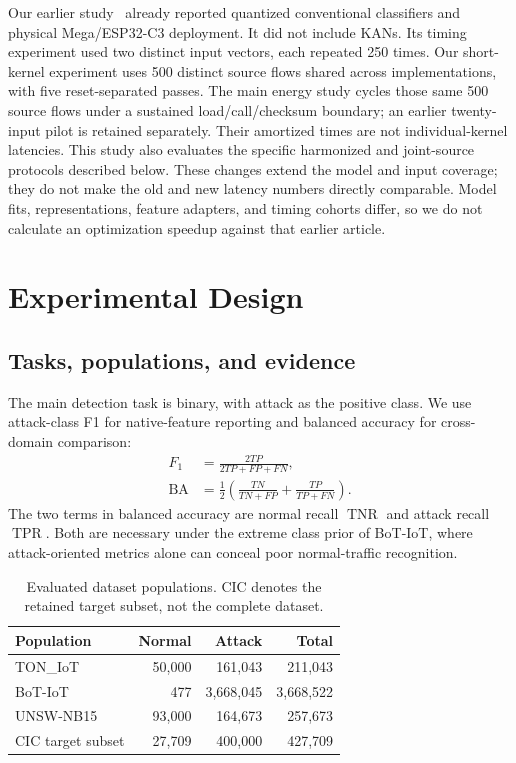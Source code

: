 \documentclass{ieeeaccess}
\newcommand{\BA}{\operatorname{BA}}
\newcommand{\TNR}{\operatorname{TNR}}
\newcommand{\TPR}{\operatorname{TPR}}
\begin{document}
Our earlier study~\cite{debernardis2026lightweight} already reported quantized conventional classifiers and physical Mega/ESP32-C3 deployment. It did not include KANs. Its timing experiment used two distinct input vectors, each repeated 250 times. Our short-kernel experiment uses 500 distinct source flows shared across implementations, with five reset-separated passes. The main energy study cycles those same 500 source flows under a sustained load/call/checksum boundary; an earlier twenty-input pilot is retained separately. Their amortized times are not individual-kernel latencies. This study also evaluates the specific harmonized and joint-source protocols described below. These changes extend the model and input coverage; they do not make the old and new latency numbers directly comparable. Model fits, representations, feature adapters, and timing cohorts differ, so we do not calculate an optimization speedup against that earlier article.

\section{Experimental Design}
\subsection{Tasks, populations, and evidence}
The main detection task is binary, with attack as the positive class. We use attack-class F1 for native-feature reporting and balanced accuracy for cross-domain comparison:
\begin{equation}
\begin{split}
F_1&=\frac{2TP}{2TP+FP+FN},\\
\BA&=\frac{1}{2}\left(\frac{TN}{TN+FP}+\frac{TP}{TP+FN}\right).
\end{split}
\label{eq:metrics}
\end{equation}
The two terms in balanced accuracy are normal recall $\TNR$ and attack recall $\TPR$. Both are necessary under the extreme class prior of BoT-IoT, where attack-oriented metrics alone can conceal poor normal-traffic recognition.

\begin{table}[t]
\caption{Evaluated dataset populations. CIC denotes the retained target subset, not the complete dataset.}
\label{tab:populations}
\centering\footnotesize
\begin{tabular}{lrrr}
\toprule
Population & Normal & Attack & Total\\
\midrule
TON\_IoT & 50,000 & 161,043 & 211,043\\
BoT-IoT & 477 & 3,668,045 & 3,668,522\\
UNSW-NB15 & 93,000 & 164,673 & 257,673\\
CIC target subset & 27,709 & 400,000 & 427,709\\
\bottomrule
\end{tabular}
\end{table}
\end{document}
